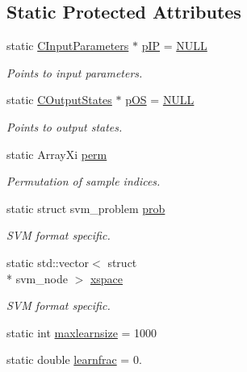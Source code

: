 \subsection*{Static Protected Attributes}
\begin{DoxyCompactItemize}
\item 
static \hyperlink{class_go_s_u_m_1_1_c_input_parameters}{C\-Input\-Parameters} $\ast$ \hyperlink{class_go_s_u_m_1_1_c_single_a_m_a0816476bc95532d1ba3e1f9198ac9d09}{p\-I\-P} = \hyperlink{struct_go_s_u_m_a3e6605d298c4dcd991f606a654a6cae4}{N\-U\-L\-L}
\begin{DoxyCompactList}\small\item\em Points to input parameters. \end{DoxyCompactList}\item 
static \hyperlink{class_go_s_u_m_1_1_c_output_states}{C\-Output\-States} $\ast$ \hyperlink{class_go_s_u_m_1_1_c_single_a_m_adb33dda815cdb845accba4ea8c7a0d61}{p\-O\-S} = \hyperlink{struct_go_s_u_m_a3e6605d298c4dcd991f606a654a6cae4}{N\-U\-L\-L}
\begin{DoxyCompactList}\small\item\em Points to output states. \end{DoxyCompactList}\item 
static Array\-Xi \hyperlink{class_go_s_u_m_1_1_c_single_a_m_a920cc0a3474605d576acde4639e37487}{perm}
\begin{DoxyCompactList}\small\item\em Permutation of sample indices. \end{DoxyCompactList}\item 
static struct svm\-\_\-problem \hyperlink{class_go_s_u_m_1_1_c_single_a_m_a85d854a5ad2d7c574f8f2ab689de6418}{prob}
\begin{DoxyCompactList}\small\item\em S\-V\-M format specific. \end{DoxyCompactList}\item 
static std\-::vector$<$ struct \\*
svm\-\_\-node $>$ \hyperlink{class_go_s_u_m_1_1_c_single_a_m_a1f9346a510fdb3908c9f7f5947a75410}{xspace}
\begin{DoxyCompactList}\small\item\em S\-V\-M format specific. \end{DoxyCompactList}\item 
static int \hyperlink{class_go_s_u_m_1_1_c_single_a_m_acf4f5351e6f159a04d1af48304934fc8}{maxlearnsize} = 1000
\item 
static double \hyperlink{class_go_s_u_m_1_1_c_single_a_m_a10aa46c970ec92e30099d2db7cabd645}{learnfrac} = 0.
\end{DoxyCompactItemize}
